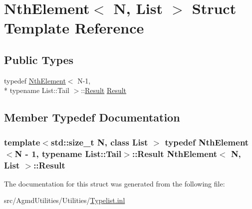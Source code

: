 \hypertarget{struct_nth_element}{\section{Nth\+Element$<$ N, List $>$ Struct Template Reference}
\label{struct_nth_element}
}
\subsection*{Public Types}
\begin{DoxyCompactItemize}
\item 
typedef \hyperlink{struct_nth_element}{Nth\+Element}$<$ N-\/1, \\*
typename List\+::\+Tail $>$\+::\hyperlink{struct_nth_element_a2c278ae97d4116eada839fcf1609762f}{Result} \hyperlink{struct_nth_element_a2c278ae97d4116eada839fcf1609762f}{Result}
\end{DoxyCompactItemize}


\subsection{Member Typedef Documentation}
\hypertarget{struct_nth_element_a2c278ae97d4116eada839fcf1609762f}{
\subsubsection[{Result}]{\setlength{\rightskip}{0pt plus 5cm}template$<$std\+::size\+\_\+t N, class List $>$ typedef {\bf Nth\+Element}$<$N -\/ 1, typename List\+::\+Tail$>$\+::{\bf Result} {\bf Nth\+Element}$<$ N, List $>$\+::{\bf Result}}}\label{struct_nth_element_a2c278ae97d4116eada839fcf1609762f}


The documentation for this struct was generated from the following file\+:\begin{DoxyCompactItemize}
\item 
src/\+Agmd\+Utilities/\+Utilities/\hyperlink{_typelist_8inl}{Typelist.\+inl}\end{DoxyCompactItemize}
